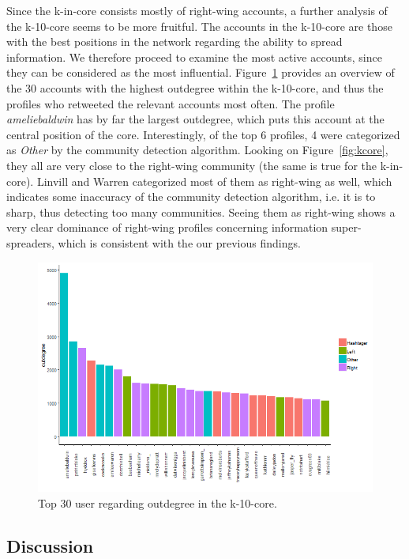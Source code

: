 \documentclass[12pt, titlepage=true, toc=bib]{scrartcl}
\begin{document}
Since the k-in-core consists mostly of right-wing accounts, a further analysis of the k-10-core seems to be more fruitful. The accounts in the k-10-core are those with the best positions in the network regarding the ability to spread information. We therefore proceed to examine the most active accounts, since they can be considered as the most influential. Figure~\ref{fig:k10in} provides an overview of the 30 accounts with the highest outdegree within the k-10-core, and thus the profiles who retweeted the relevant accounts most often. The profile \textit{ameliebaldwin} has by far the largest outdegree, which puts this account at the central position of the core. Interestingly, of the top 6 profiles, 4 were categorized as \textit{Other} by the community detection algorithm. Looking on Figure~\ref{fig:kcore}, they all are very close to the right-wing community (the same is true for the k-in-core). Linvill and Warren categorized most of them as right-wing as well, which indicates some inaccuracy of the community detection algorithm, i.e. it is to sharp, thus detecting too many communities. Seeing them as right-wing shows a very clear dominance of right-wing profiles concerning information super-spreaders, which is consistent with the our previous findings.

\begin{figure}[!ht]
\centering
\includegraphics[width=0.95\linewidth]{k10_figure}
\caption{Top 30 user regarding outdegree in the k-10-core.}
\label{fig:k10in}
\end{figure}


\subsection{Discussion}
\end{document}
